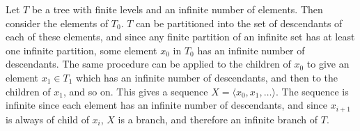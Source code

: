\documentclass[12pt]{article}
\begin{document}
Let $T$ be a tree with finite levels and an infinite number of elements.  Then consider the elements of $T_0$.  $T$ can be partitioned into the set of descendants of each of these elements, and since any finite partition of an infinite set has at least one infinite partition, some element $x_0$ in $T_0$ has an infinite number of descendants.  The same procedure can be applied to the children of $x_0$ to give an element $x_1\in T_1$ which has an infinite number of descendants, and then to the children of $x_1$, and so on.  This gives a sequence $X=\langle x_0, x_1,\ldots \rangle$. The sequence is infinite since each element has an infinite number of descendants, and since $x_{i+1}$ is always of child of $x_i$, $X$ is a branch, and therefore an infinite branch of $T$.
\end{document}
